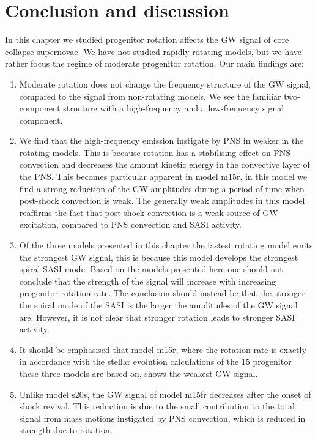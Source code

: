 \section{Conclusion and discussion}
In this chapter we studied progenitor rotation affects the GW signal of core collapse supernovae.
We have not studied rapidly rotating models, but we have rather focus the regime of moderate progenitor rotation.
Our main findings are:
\begin{enumerate}
\item Moderate rotation does not change the frequency structure of the GW signal, compared to the signal from non-rotating models.
We see the familiar two-component structure with a high-frequency and a low-frequency signal component.
\item We find that the high-frequency emission instigate by PNS in weaker in the rotating models. This is because 
rotation has a stabilising effect on PNS convection and decreases the amount kinetic energy in the convective layer of the PNS.
This becomes particular apparent in model m15r, in this model we find a strong reduction of the GW amplitudes during a 
period of time when post-shock convection is weak. The generally weak amplitudes in this model reaffirms the fact that 
post-shock convection is a weak source of GW excitation, compared to PNS convection and SASI activity.
\item Of the three models presented in this chapter the fastest rotating model emits the strongest GW signal, this is
because this model develops the strongest spiral SASI mode. Based on the models presented here one should not conclude
that the strength of the signal will increase with increasing progenitor rotation rate. The conclusion should instead be
that the stronger the spiral mode of the SASI is the larger the amplitudes of the GW signal are. However, it is not clear
that stronger rotation leads to stronger SASI activity.
\item It should be emphasised that model m15r, where the rotation rate is exactly in accordance with the stellar evolution
calculations of the 15 \msun progenitor these three models are based on, shows the weakest GW signal.  
\item Unlike model s20s, the GW signal of model m15fr decreases after the onset of shock revival. This reduction is due to
the small contribution to the total signal from mass motions instigated by PNS convection, which is reduced in strength due to
rotation.
\end{enumerate}

